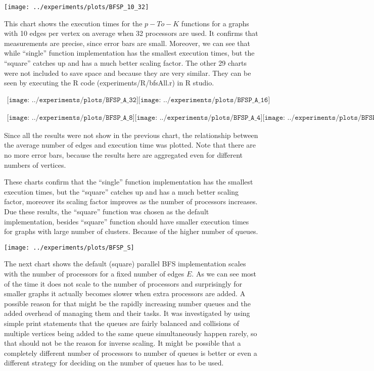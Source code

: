 \documentclass{report}
\theoremstyle{plain}
\theoremstyle{definition}
\theoremstyle{remark}
\begin{document}
\texttt{[image: ../experiments/plots/BFSP\_10\_32]}

This chart shows the execution times for the $p-To-K$ functions for a graphs with 10 edges per vertex on average when 32 processors are used. It confirms that measurements are precise, since error bars are small. Moreover, we can see that while ``single'' function implementation has the smallest execution times, but the ``square'' catches up and has a much better scaling factor. The other 29 charts were not included to save space and because they are very similar. They can be seen by executing the R code (experiments/R/bfsAll.r) in R studio.

\begin{center}
$
\begin{array}{cc}
\texttt{[image: ../experiments/plots/BFSP\_A\_32]}
\texttt{[image: ../experiments/plots/BFSP\_A\_16]}
\end{array}
$

\center
$
\begin{array}{cc}
\texttt{[image: ../experiments/plots/BFSP\_A\_8]}
\texttt{[image: ../experiments/plots/BFSP\_A\_4]}
\texttt{[image: ../experiments/plots/BFSP\_A\_2]}
\end{array}
$
\end{center}

Since all the results were not show in the previous chart, the relationship between the average number of edges and execution time was plotted. Note that there are no more error bars, because the results here are aggregated even for different numbers of vertices.

These charts confirm that the ``single'' function implementation has the smallest execution times, but the ``square'' catches up and has a much better scaling factor, moreover its scaling factor improves as the number of processors increases. Due these results, the ``square'' function was chosen as the default implementation, besides ``square'' function should have smaller execution times for graphs with large number of clusters. Because of the higher number of queues.

\texttt{[image: ../experiments/plots/BFSP\_S]}

The next chart shows the default (square) parallel BFS implementation scales with the number of processors for a fixed number of edges $E$. As we can see most of the time it does not scale to the number of processors and surprisingly for smaller graphs it actually becomes slower when extra processors are added. A possible reason  for that might be the rapidly increasing number queues and the added overhead of managing them and their tasks. It was investigated by using simple print statements that the queues are fairly balanced and collisions of multiple vertices being added to the same queue simultaneously happen rarely, so that should not be the reason for inverse scaling. It might be possible that a completely different number of processors to number of queues is better or even a different strategy for deciding on the number of queues has to be used.
\end{document}
